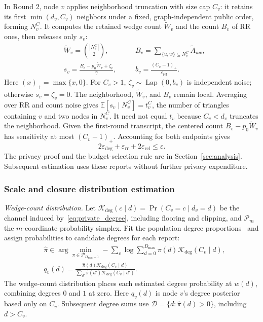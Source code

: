 In Round 2, node $v$ applies neighborhood truncation with size cap $C_v$: it retains its first $\min(d_v,C_v)$ neighbors under a fixed, graph-independent public order, forming $N_v^C$. It computes the retained wedge count $\widetilde W_v$ and the count $B_v$ of RR ones, then releases only $s_v$:
\begin{equation}
\begin{alignedat}{2}
&\widetilde W_v=\binom{|N_v^C|}{2}, &\quad& B_v=\sum_{\{u,w\}\subseteq N_v^C}\widetilde A_{uw},\\
&s_v=\frac{B_v-p_0\widetilde W_v+\zeta_v}{\gamma}, &\quad& b_v=\frac{(C_v-1)_+}{\varepsilon_{\mathrm{rel}}}.
\end{alignedat}
\label{eq:private_relational_statistic}
\end{equation}
Here $(x)_+=\max\{x,0\}$. For $C_v>1$, $\zeta_v\sim\operatorname{Lap}(0,b_v)$ is independent noise; otherwise $s_v=\zeta_v=0$. The neighborhood, $\widetilde W_v$, and $B_v$ remain local. Averaging over RR and count noise gives $\mathbb E[s_v\mid N_v^C]=t_v^C$, the number of triangles containing $v$ and two nodes in $N_v^C$. It need not equal $t_v$ because $C_v<d_v$ truncates the neighborhood. Given the first-round transcript, the centered count $B_v-p_0\widetilde W_v$ has sensitivity at most $(C_v-1)_+$. Accounting for both endpoints gives
\begin{equation}
2\varepsilon_{\mathrm{deg}}+\varepsilon_{\mathrm{rr}}+
2\varepsilon_{\mathrm{rel}}\le\varepsilon.
\label{eq:privacy_allocation}
\end{equation}
The privacy proof and the budget-selection rule are in Section~\ref{sec:analysis}. Subsequent estimation uses these reports without further privacy expenditure.

\subsubsection{Scale and closure distribution estimation}
\emph{Wedge-count distribution.} Let $\mathcal K_{\mathrm{deg}}(c\mid d)=\Pr(C_v=c\mid d_v=d)$ be the channel induced by~\eqref{eq:private_degree}, including flooring and clipping, and $\mathcal P_m$ the $m$-coordinate probability simplex. Fit the population degree proportions~\cite{koenker2014convex} and assign probabilities to candidate degrees for each report:
\begin{equation}
\begin{aligned}
&\widehat\pi\in\arg\min_{\pi\in\mathcal P_{D_{\max}+1}}
-\sum_v\log\sum_{d=0}^{D_{\max}}\pi(d)\mathcal K_{\mathrm{deg}}(C_v\mid d),\\
&q_v(d)=\frac{\widehat\pi(d)\mathcal K_{\mathrm{deg}}(C_v\mid d)}
{\sum_{d'}\widehat\pi(d')\mathcal K_{\mathrm{deg}}(C_v\mid d')}.
\end{aligned}
\label{eq:degree_distribution}
\end{equation}
The wedge-count distribution places each estimated degree probability at $w(d)$, combining degrees $0$ and $1$ at zero. Here $q_v(d)$ is node $v$'s degree posterior based only on $C_v$. Subsequent degree sums use $\mathcal D=\{d:\widehat\pi(d)>0\}$, including $d>C_v$.

